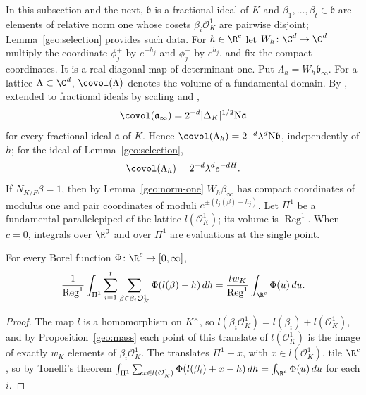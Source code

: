 In this subsection and the next, $\mathfrak b$ is a fractional ideal of $K$ and
$\beta_1,\dots,\beta_t\in\mathfrak b$ are elements of relative norm one whose
cosets $\beta_i\mathcal O_K^1$ are pairwise disjoint;
Lemma~\ref{geo:selection} provides such data. For $h\in\R^c$ let
$W_h\colon\C^d\to\C^d$ multiply the coordinate $\phi_j^+$ by
$e^{-h_j}$ and $\phi_j^-$ by $e^{h_j}$, and fix the compact
coordinates. It is a real diagonal map of determinant one. Put
$\Lambda_h=W_h\mathfrak b_\infty$. For a lattice $\Lambda\subset\C^d$,
$\covol(\Lambda)$ denotes the volume of a fundamental domain. By
\cite[Proposition~4.26]{MilneANT}, extended to fractional ideals by
scaling and \cite[Proposition~4.2]{MilneANT},
\begin{equation}\label{geo:covolume}
 \covol(\mathfrak a_\infty)=2^{-d}|\Delta_K|^{1/2}\mathrm N\mathfrak a
\end{equation}
for every fractional ideal $\mathfrak a$ of $K$. Hence
$\covol(\Lambda_h)=2^{-d}\lambda^d\mathrm N\mathfrak b$, independently of $h$; for the
ideal of Lemma~\ref{geo:selection},
\begin{equation}\label{geo:determinant}
 \covol(\Lambda_h)=2^{-d}\lambda^de^{-dH}.
\end{equation}
If $N_{K/F}\beta=1$, then by Lemma~\ref{geo:norm-one}
$W_h\beta_\infty$ has compact coordinates of modulus one and pair
coordinates of moduli $e^{\pm(l_j(\beta)-h_j)}$.
Let $\Pi^1$ be a fundamental parallelepiped of the lattice
$l(\mathcal O_K^1)$; its volume is $\operatorname{Reg}^1$. When $c=0$,
integrals over $\R^0$ and over $\Pi^1$ are evaluations at the single
point.

\begin{lemma}\label{geo:unfold-lemma}
For every Borel function $\Phi\colon\R^c\to[0,\infty]$,
\begin{equation}\label{geo:unfold}
 \frac1{\operatorname{Reg}^1}\int_{\Pi^1}\sum_{i=1}^t
 \sum_{\beta\in\beta_i\mathcal O_K^1}\Phi(l(\beta)-h)\,dh
 =\frac{tw_K}{\operatorname{Reg}^1}\int_{\R^c}\Phi(u)\,du .
\end{equation}
\end{lemma}

\begin{proof}
The map $l$ is a homomorphism on $K^\times$, so
$l(\beta_i\mathcal O_K^1)=l(\beta_i)+l(\mathcal O_K^1)$, and by
Proposition~\ref{geo:mass} each point of this translate of
$l(\mathcal O_K^1)$ is the image of exactly $w_K$ elements of
$\beta_i\mathcal O_K^1$. The translates $\Pi^1-x$, with
$x\in l(\mathcal O_K^1)$, tile $\R^c$, so by Tonelli's theorem
$\int_{\Pi^1}\sum_{x\in l(\mathcal
O_K^1)}\Phi(l(\beta_i)+x-h)\,dh=\int_{\R^c}\Phi(u)\,du$ for each
$i$.
\end{proof}

